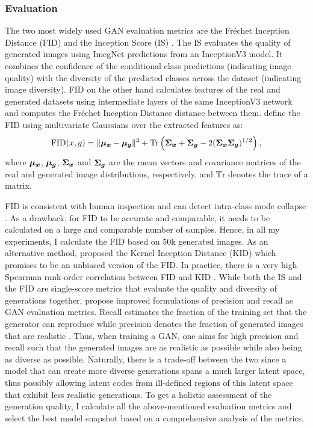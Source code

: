 \subsubsection{Evaluation}\label{sec:gan_evaluation}
The two most widely used GAN evaluation metrics are the Fr\'echet Inception Distance (FID) and the Inception Score (IS) \citep[p.2]{borji2022pros}. The IS \citep{salimans2016improved} evaluates the quality of generated images using ImegNet \citep{deng2009imagenet} predictions from an InceptionV3 \citep{szegedy2016rethinking} model. It combines the confidence of the conditional class predictions (indicating image quality) with the diversity of the predicted classes across the dataset (indicating image diversity). FID \citep{heusel2017gans} on the other hand calculates features of the real and generated datasets using intermediate layers of the same InceptionV3 \citep{szegedy2016rethinking} network and computes the Fr\'echet Inception Distance distance between them. \cite{heusel2017gans} define the FID using multivariate Gaussians over the extracted features as: 
$$\text{FID}(x, g) = \| \boldsymbol{\mu_x} - \boldsymbol{\mu_g} \|^2 + \text{Tr}\left( \boldsymbol{\Sigma_x} + \boldsymbol{\Sigma_g} - 2(\boldsymbol{\Sigma_x}  \boldsymbol{\Sigma_g})^{1/2} \right),$$
where $\boldsymbol{\mu_x}$, $\boldsymbol{\mu_g}$, $\boldsymbol{\Sigma_x} $ and $\boldsymbol{\Sigma_g}$ are the mean vectors and covariance matrices of the real and generated image distributions, respectively, and $\text{Tr}$ denotes the trace of a matrix. 

FID is consistent with human inspection and can detect intra-class mode collapse \citep[p.2]{borji2022pros}. As a drawback, for FID to be accurate and comparable, it needs to be calculated on a large and comparable number of samples. Hence, in all my experiments, I calculate the FID based on 50k generated images. As an alternative method, \cite{binkowski2018demystifying} proposed the Kernel Inception Distance (KID) which promises to be an unbiased version of the FID. In practice, there is a very high Spearman rank-order correlation between FID and KID \citep[p.3]{kurach2018gan}. While both the IS and the FID are single-score metrics that evaluate the quality and diversity of generations together, \cite{sajjadi2018assessing} propose improved formulations of precision and recall as GAN evaluation metrics. Recall estimates the fraction of the training set that the generator can reproduce while precision denotes the fraction of generated images that are realistic \citep[p.5]{kynkaanniemi2019improved}. Thus, when training a GAN, one aims for high precision and recall such that the generated images are as realistic as possible while also being as diverse as possible. Naturally, there is a trade-off between the two since a model that can create more diverse generations spans a much larger latent space, thus possibly allowing latent codes from ill-defined regions of this latent space that exhibit less realistic generations. To get a holistic assessment of the generation quality, I calculate all the above-mentioned evaluation metrics and select the best model snapshot based on a comprehensive analysis of the metrics.